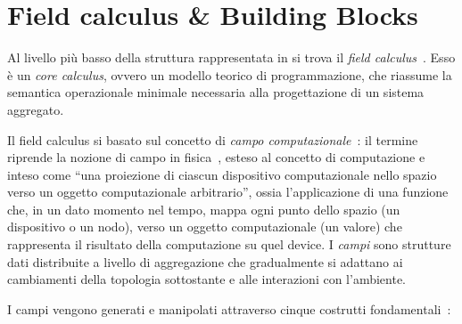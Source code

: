 \section{Field calculus \& Building Blocks}\label{sec:field-calculus}

Al livello più basso della struttura rappresentata in  si trova il \emph{field calculus}~\cite{FieldCalculusFOCLASA2013}.
Esso è un \emph{core calculus}, ovvero un modello teorico di programmazione, che riassume la semantica operazionale minimale necessaria alla progettazione di un sistema aggregato.

Il field calculus si basato sul concetto di \emph{campo computazionale}~\cite{FieldCalculusFOCLASA2013}:
il termine riprende la nozione di campo in fisica~\cite{mcmullin2002origins}, esteso al concetto di computazione
e inteso come ``una proiezione di ciascun dispositivo computazionale nello spazio verso un oggetto computazionale arbitrario'',
ossia l'applicazione di una funzione che, in un dato momento nel tempo, mappa ogni punto dello spazio (un dispositivo o un nodo),
verso un oggetto computazionale (un valore) che rappresenta il risultato della computazione su quel device.
I \emph{campi} sono strutture dati distribuite a livello di aggregazione che gradualmente si adattano ai cambiamenti della topologia sottostante e alle interazioni con l'ambiente.

I campi vengono generati e manipolati attraverso cinque costrutti fondamentali~\cite{BV-FOCAS2014,computationalfields-forte2015}:


